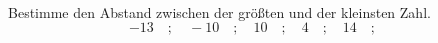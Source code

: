 \begin{aufgabe} ~ \\ 
Bestimme den Abstand zwischen der größten und der kleinsten Zahl.\[-13\quad ; \quad-10\quad ; \quad10\quad ; \quad4\quad ; \quad14\quad ; \quad\]\underline{\hspace{12cm}}\end{aufgabe} 
